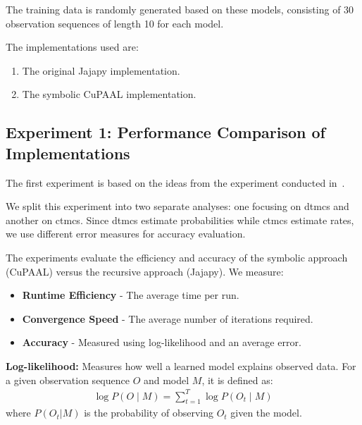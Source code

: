 The training data is randomly generated based on these models, consisting of 30 observation sequences of length 10 for each model.

The implementations used are:
\begin{enumerate}
    \item The original Jajapy implementation.
    \item The symbolic CuPAAL implementation.
\end{enumerate}

\subsection{Experiment 1: Performance Comparison of Implementations}
The first experiment is based on the ideas from the experiment conducted in~\cite{reynouard2024learning}.

We split this experiment into two separate analyses: one focusing on \glspl{dtmc} and another on \glspl{ctmc}. Since \glspl{dtmc} estimate probabilities while \glspl{ctmc} estimate rates, we use different error measures for accuracy evaluation.

The experiments evaluate the efficiency and accuracy of the symbolic approach (CuPAAL) versus the recursive approach (Jajapy). We measure:
\begin{itemize}
    \item \textbf{Runtime Efficiency} - The average time per run.
    \item \textbf{Convergence Speed} - The average number of iterations required.
    \item \textbf{Accuracy} - Measured using log-likelihood and an average error.
\end{itemize}

\textbf{Log-likelihood:} Measures how well a learned model explains observed data.
For a given observation sequence $O$ and model $M$, it is defined as:
\begin{equation}
    \begin{aligned}
        \log P(O \mid M) = \sum_{t=1}^{T} \log P(O_t \mid M)
    \end{aligned}
\end{equation}
where $P(O_t|M)$ is the probability of observing $O_t$ given the model.


